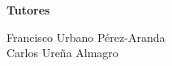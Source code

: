 \begin{titlepage}
\begin{minipage}{\textwidth}
\textbf{Tutores}\\
\begin{multicols}{2}
	Francisco Urbano Pérez-Aranda\\
	\columnbreak
	Carlos Ureña Almagro
\end{multicols}%
\end{minipage}

 
\end{titlepage}


